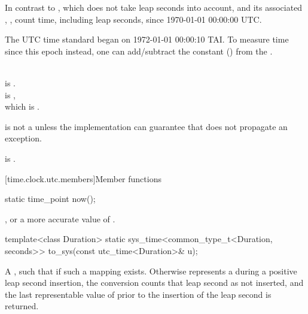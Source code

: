 \pnum
In contrast to ,
which does not take leap seconds into account,
 and its associated , ,
count time, including leap seconds, since 1970-01-01 00:00:00 UTC.
\begin{note}
The UTC time standard began on 1972-01-01 00:00:10 TAI.
To measure time since this epoch instead, one can add/subtract the constant
 ()
from the .
\end{note}
\begin{example}
\\
 is . \\
 is ,\\
which is . \\
\end{example}

\pnum
{} is not a 
unless the implementation can guarantee that 
does not propagate an exception.
\begin{note}
 is .
\end{note}

[time.clock.utc.members]{Member functions}

%
\begin{itemdecl}
static time_point now();
\end{itemdecl}

\begin{itemdescr}
\pnum
\returns
{}, or a more accurate value of .
\end{itemdescr}

%
\begin{itemdecl}
template<class Duration>
  static sys_time<common_type_t<Duration, seconds>>
    to_sys(const utc_time<Duration>& u);
\end{itemdecl}

\begin{itemdescr}
\pnum
\returns
A  ,
such that  if such a mapping exists.
Otherwise  represents a 
during a positive leap second insertion,
the conversion counts that leap second as not inserted,
and the last representable value of 
prior to the insertion of the leap second is returned.
\end{itemdescr}

